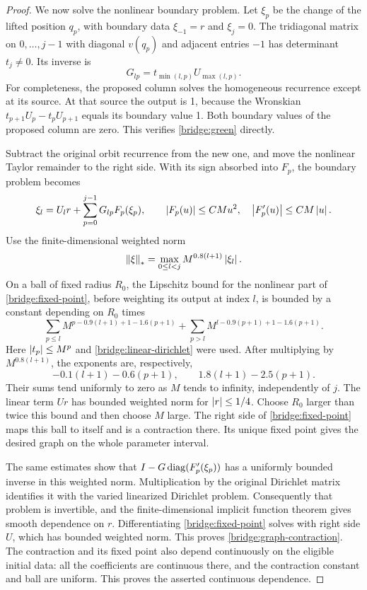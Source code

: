 \begin{proof}
We now solve the nonlinear boundary problem. Let $\xi_p$ be the
change of the lifted position $q_p$, with boundary data
$\xi_{-1}=r$ and $\xi_j=0$. The tridiagonal matrix on
$0,\ldots,j-1$ with diagonal $v(q_p)$ and adjacent entries $-1$
has determinant $t_j\ne0$. Its inverse is
\begin{equation}
 G_{lp}=t_{\min(l,p)}U_{\max(l,p)}.
 \label{bridge:green}
\end{equation}
For completeness, the proposed column solves the homogeneous
recurrence except at its source. At that source the output is 1,
because the Wronskian
$t_{p+1}U_p-t_pU_{p+1}$ equals its boundary value 1. Both boundary
values of the proposed column are zero. This verifies
\cref{bridge:green} directly.

Subtract the original orbit recurrence from the new one, and move
the nonlinear Taylor remainder to the right side. With its sign
absorbed into $F_p$, the boundary problem becomes
\begin{equation}
 \xi_l=U_l r+\sum_{p=0}^{j-1}G_{lp}F_p(\xi_p),
 \qquad
 \left\lvert F_p(u)\right\rvert\leq C M u^2,
 \quad
 \left\lvert F'_p(u)\right\rvert\leq C M\left\lvert u\right\rvert.
 \label{bridge:fixed-point}
\end{equation}
Use the finite-dimensional weighted norm
\[
 \left\lVert\xi\right\rVert_*=\max_{0\leq l<j}
          M^{0.8(l+1)}\left\lvert\xi_l\right\rvert.
\]
On a ball of fixed radius $R_0$, the Lipschitz bound for the nonlinear
part of \cref{bridge:fixed-point}, before weighting its output at
index $l$, is bounded by a constant depending on $R_0$ times
\[
 \sum_{p\leq l}
 M^{p-0.9(l+1)+1-1.6(p+1)}
 +\sum_{p>l}
 M^{l-0.9(p+1)+1-1.6(p+1)}.
\]
Here $\left\lvert t_p\right\rvert\leq M^p$ and \cref{bridge:linear-dirichlet} were
used. After multiplying by $M^{0.8(l+1)}$, the exponents are,
respectively,
\[
 -0.1(l+1)-0.6(p+1),
 \qquad
 1.8(l+1)-2.5(p+1).
\]
Their sums tend uniformly to zero as $M$ tends to infinity,
independently of $j$. The linear term $Ur$ has bounded weighted norm
for $\left\lvert r\right\rvert\leq1/4$. Choose $R_0$ larger than twice this bound and
then choose $M$ large. The right side of \cref{bridge:fixed-point}
maps this ball to itself and is a contraction there. Its unique fixed
point gives the desired graph on the whole parameter interval.

The same estimates show that
$I-G\operatorname{diag}(F'_p(\xi_p))$ has a uniformly bounded inverse in this
weighted norm. Multiplication by the original Dirichlet matrix
identifies it with the varied linearized Dirichlet problem.
Consequently that problem is invertible, and the finite-dimensional
implicit function theorem gives smooth dependence on $r$.
Differentiating \cref{bridge:fixed-point} solves with right side $U$,
which has bounded weighted norm. This proves
\cref{bridge:graph-contraction}. The contraction and its fixed point
also depend continuously on the eligible initial data: all the
coefficients are continuous there, and the contraction constant and
ball are uniform. This proves the asserted continuous dependence.


\end{proof}
